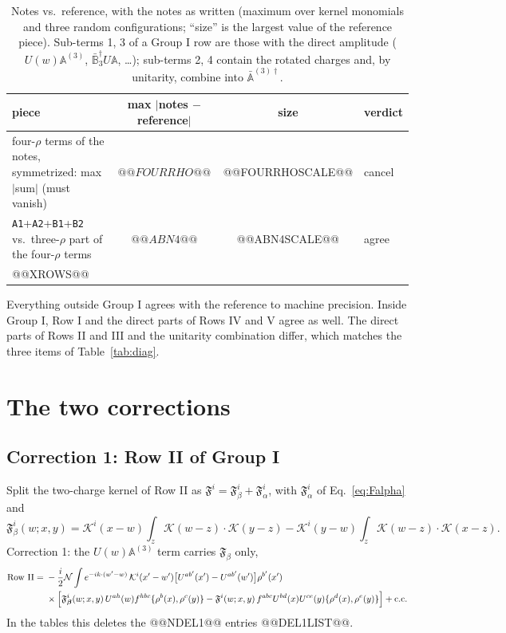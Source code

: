 \documentclass[10pt]{article}
\numberwithin{equation}{section}
\newcommand{\KK}{\mathcal K}
\newcommand{\NN}{\mathcal N}
\newcommand{\lab}[1]{\texttt{#1}}
\begin{document}
\begin{table}[h]
\centering\small
\begin{tabular}{@{}l c c l@{}}
piece & max $|$notes $-$ reference$|$ & size & verdict\\ \hline
four-$\rho$ terms of the notes, symmetrized: max $|$sum$|$ (must vanish) & $@@FOURRHO@@$ & @@FOURRHOSCALE@@ & cancel\\
\lab{A1}+\lab{A2}+\lab{B1}+\lab{B2} vs.\ three-$\rho$ part of the four-$\rho$ terms & $@@ABN4@@$ & @@ABN4SCALE@@ & agree\\
@@XROWS@@
\end{tabular}
\caption{Notes vs.\ reference, with the notes as written (maximum over kernel monomials and three random configurations; ``size'' is the largest value of the reference piece). Sub-terms 1, 3 of a Group I row are those with the direct amplitude ($U(w)\mathbb A^{(3)}$, $\bar{\mathbb B}_3^\dagger U\mathbb A$, \dots); sub-terms 2, 4 contain the rotated charges and, by unitarity, combine into $\bar{\mathbb A}^{(3)\dagger}$.}
\label{tab:reference}
\end{table}

Everything outside Group I agrees with the reference to machine precision. Inside Group I, Row I and the direct parts of Rows IV and V agree as well. The direct parts of Rows II and III and the unitarity combination differ, which matches the three items of Table~\ref{tab:diag}.

\section{The two corrections}\label{sec:corrections}

\subsection{Correction 1: Row II of Group I}
Split the two-charge kernel of Row II as $\mathfrak F^i=\mathfrak F^i_\beta+\mathfrak F^i_\alpha$, with $\mathfrak F^i_\alpha$ of Eq.~\eqref{eq:Falpha} and
\begin{equation}
\mathfrak F^i_\beta(w;x,y)=\KK^i(x-w)\int_z\KK(w-z)\cdot\KK(y-z)-\KK^i(y-w)\int_z\KK(w-z)\cdot\KK(x-z).
\end{equation}
Correction 1: the $U(w)\mathbb A^{(3)}$ term carries $\mathfrak F_\beta$ only,
\begin{align}
\text{Row II}={}&-\frac i2\NN\int e^{-ik\cdot(w'-w)}\,\KK^i(x'-w')\big[U^{ab'}(x')-U^{ab'}(w')\big]\rho^{b'}(x')\notag\\
&\times\Big[\mathfrak F^i_{\boldsymbol\beta}(w;x,y)\,U^{ah}(w)f^{hbc}\{\rho^b(x),\rho^c(y)\}-\mathfrak F^i(w;x,y)\,f^{abc}U^{bd}(x)U^{ce}(y)\{\rho^d(x),\rho^e(y)\}\Big]+{\rm c.c.}
\label{eq:RowIIcorr}
\end{align}
In the tables this deletes the @@NDEL1@@ entries @@DEL1LIST@@.
\end{document}

